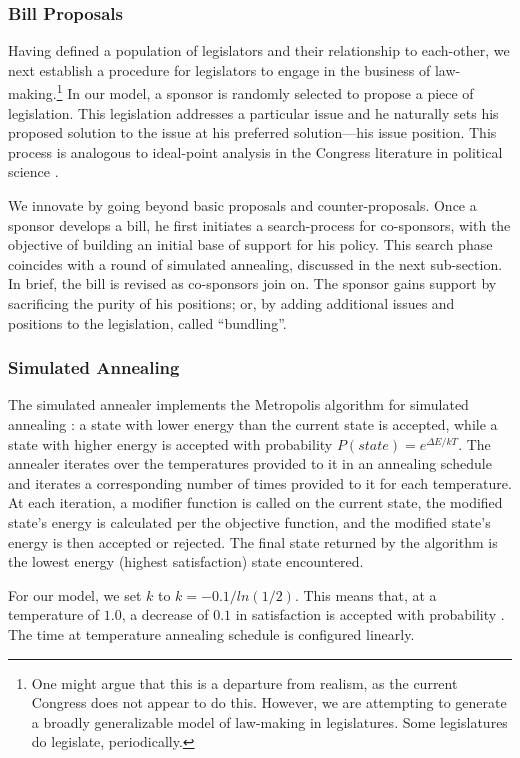 \documentclass[pdftex,12pt]{llncs}
\begin{document}
\subsubsection{Bill Proposals}
Having defined a population of legislators and their relationship to each-other, we next establish a procedure for legislators to engage in the business of law-making.\footnote{One might argue that this is a departure from realism, as the current Congress does not appear to do this. However, we are attempting to generate a broadly generalizable model of law-making in legislatures. Some legislatures do legislate, periodically.} 
In our model, a sponsor is randomly selected to propose a piece of legislation. 
This legislation addresses a particular issue and he naturally sets his proposed solution to the issue at his preferred solution---his issue position. 
This process is analogous to ideal-point analysis in the Congress literature in political science \parencite{k98}. 

We innovate by going beyond basic proposals and counter-proposals. 
Once a sponsor develops a bill, he first initiates a search-process for co-sponsors, with the objective of building an initial base of support for his policy. 
This search phase coincides with a round of simulated annealing, discussed in the next sub-section. 
In brief, the bill is revised as co-sponsors join on. 
The sponsor gains support by sacrificing the purity of his positions; or, by adding additional issues and positions to the legislation, called ``bundling''.  

\subsubsection{Simulated Annealing}
The simulated annealer implements the Metropolis algorithm for simulated annealing \parencite{mrrt53, kgv}: a state with lower energy than the current state is accepted, while a state with higher energy is accepted with probability $P(state) = e^{\Delta E/kT}$.  
The annealer iterates over the temperatures provided to it in an annealing schedule and iterates a corresponding number of times provided to it for each temperature.  
At each iteration, a modifier function is called on the current state, the modified state's energy is calculated per the objective function, and the modified state's energy is then accepted or rejected.  
The final state returned by the algorithm is the lowest energy (highest satisfaction) state encountered.

For our model, we set $k$ to $k = -0.1/ln(1/2)$.  
This means that, at a temperature of $1.0$, a decrease of $0.1$ in satisfaction is accepted with probability . 
The time at temperature annealing schedule is configured linearly.
\end{document}
